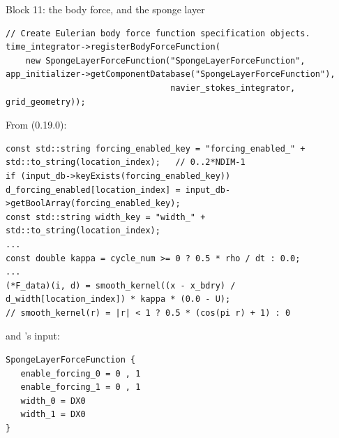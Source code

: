 \documentclass[aspectratio=169,11pt]{beamer}
\begin{document}
\begin{frame}[fragile]{Block 11: the body force, and the sponge layer}
\label{fr:sponge}
\footnotesize
\begin{lstlisting}[style=cpptiny]
// Create Eulerian body force function specification objects.
time_integrator->registerBodyForceFunction(
    new SpongeLayerForceFunction("SpongeLayerForceFunction", app_initializer->getComponentDatabase("SpongeLayerForceFunction"),
                                 navier_stokes_integrator, grid_geometry));
\end{lstlisting}
From  (0.19.0):
\begin{lstlisting}[style=cpptiny]
const std::string forcing_enabled_key = "forcing_enabled_" + std::to_string(location_index);   // 0..2*NDIM-1
if (input_db->keyExists(forcing_enabled_key)) d_forcing_enabled[location_index] = input_db->getBoolArray(forcing_enabled_key);
const std::string width_key = "width_" + std::to_string(location_index);
...
const double kappa = cycle_num >= 0 ? 0.5 * rho / dt : 0.0;
...
(*F_data)(i, d) = smooth_kernel((x - x_bdry) / d_width[location_index]) * kappa * (0.0 - U);
// smooth_kernel(r) = |r| < 1 ? 0.5 * (cos(pi r) + 1) : 0
\end{lstlisting}
and 's input:
\begin{lstlisting}[style=inputtiny]
SpongeLayerForceFunction {
   enable_forcing_0 = 0 , 1
   enable_forcing_1 = 0 , 1
   width_0 = DX0
   width_1 = DX0
}
\end{lstlisting}
\end{frame}
\end{document}
